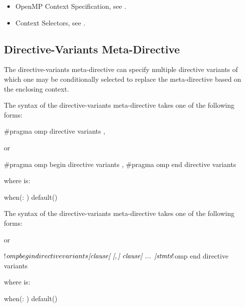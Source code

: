 \crossreferences
\begin{itemize}
\item OpenMP Context Specification, see .
\item Context Selectors, see .
\end{itemize}

\subsection{Directive-Variants Meta-Directive}
\label{sec:directive variants}
\summary
The directive-variants meta-directive can specify multiple directive variants
of which one may be conditionally selected to replace the meta-directive based
on the enclosing context.

\syntax
\begin{ccppspecific}
The syntax of the directive-variants meta-directive takes one of the
following forms:
\begin{ompcPragma}
#pragma omp directive variants \plc{[clause[ [},\plc{] clause] ... ] new-line}
\end{ompcPragma}
or
\begin{ompcPragma}
#pragma omp begin directive variants \plc{[clause[ [},\plc{] clause] ... ] new-line}
#pragma omp end directive variants
\end{ompcPragma}


\begin{samepage}
where  is:
\begin{indentedcodelist}
    when(: )
    default()
\end{indentedcodelist}
\end{samepage}

\end{ccppspecific}

\begin{fortranspecific}
The syntax of the directive-variants meta-directive takes one of the following
forms:


or 

\begin{ompfPragma}
!$omp begin directive variants \plc{[clause[ [},\plc{] clause] ... ]}
!$omp end directive variants
\end{ompfPragma}

\begin{samepage}
where  is:

\begin{indentedcodelist}
    when(: )
    default()
\end{indentedcodelist}
\end{samepage}

\end{fortranspecific}

